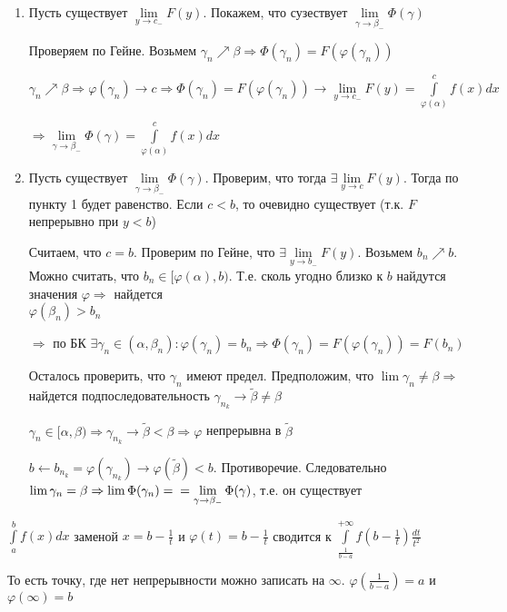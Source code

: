 \documentclass[12pt]{article}
\begin{document}
\begin{enumerate}
    \item Пусть существует $\lim\limits_{y \to c_-} F(y)$. Покажем, что сузествует $\lim\limits_{\gamma \to \beta_-} \Phi(\gamma)$
    
    Проверяем по Гейне. Возьмем $\gamma_n \nearrow \beta \Rightarrow \Phi(\gamma_n) = F(\varphi(\gamma_n))$

    $\gamma_n \nearrow \beta \Rightarrow \varphi(\gamma_n) \to c \Rightarrow \Phi(\gamma_n) = F(\varphi(\gamma_n)) \to \lim\limits_{y \to c_-} F(y) = \int\limits_{\varphi(\alpha)}^c f(x)dx$

    $\Rightarrow \lim\limits_{\gamma \to \beta_-} \Phi(\gamma) = \int\limits_{\varphi(\alpha)}^c f(x)dx$

    \item Пусть существует $\lim\limits_{\gamma \to \beta_-} \Phi(\gamma)$. Проверим, что тогда $\exists \lim\limits_{y \to c} F(y)$. Тогда по пункту 1 будет равенство. Если $c < b$, то очевидно существует (т.к. $F$ непрерывно при $y < b$)
    
    Считаем, что $c = b$. Проверим по Гейне, что $\exists \lim\limits_{y \to b_-} F(y)$. Возьмем $b_n \nearrow b$. Можно считать, что $b_n \in [\varphi(\alpha), b)$. Т.е. сколь угодно близко к $b$ найдутся значения $\varphi \Rightarrow$ найдется \\ $\varphi(\beta_n) > b_n$

    $\Rightarrow$ по БК $\exists \gamma_n \in (\alpha, \beta_n) : \varphi(\gamma_n) = b_n \Rightarrow \Phi(\gamma_n) = F(\varphi(\gamma_n)) = F(b_n)$

    Осталось проверить, что $\gamma_n$ имеют предел. Предположим, что $\lim \gamma_n \neq \beta \Rightarrow$ найдется подпоследовательность $\gamma_{n_k} \to \tilde{\beta} \neq \beta$

    $\gamma_n \in [\alpha, \beta) \Rightarrow \gamma_{n_k} \to \tilde{\beta} < \beta \Rightarrow \varphi$ непрерывна в $\tilde{\beta}$

    $b \leftarrow b_{n_k} = \varphi(\gamma_{n_k}) \to \varphi(\tilde{\beta}) < b$. Противоречие. Следовательно $\lim \gamma_n = \beta \Rightarrow \lim \Phi(\gamma_n) = \\ = \lim\limits_{\gamma \to \beta_-} \Phi(\gamma)$, т.е. он существует
\end{enumerate}

\begin{Remark}{}
    $\int\limits_a^b f(x)dx$ заменой $x = b - \frac{1}{t}$ и $\varphi(t) = b - \frac{1}{t}$ сводится к $\int\limits_{\frac{1}{b - a}}^{+ \infty} f(b - \frac{1}{t})\frac{dt}{t^2}$

    То есть точку, где нет непрерывности можно записать на $\infty$. $\varphi(\frac{1}{b - a}) = a$ и $\varphi(\infty) = b$
\end{Remark}
\end{document}
